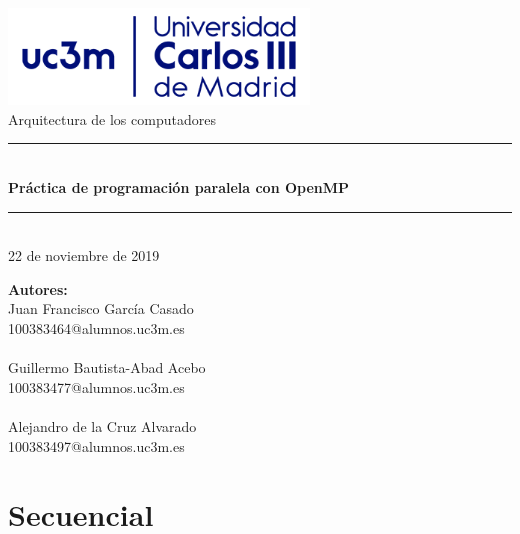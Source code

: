\documentclass[12pt]{article}
\begin{document}
    \begin{center}
    \includegraphics[width=80mm]{uc3m.png}
    \\ \vspace{40mm}
    \LARGE Arquitectura de los computadores
    \\
    \noindent\rule{12cm}{0.4pt}
    \\
    \vspace{5mm}
    \textbf{\Huge Práctica de programación paralela con OpenMP}
    \\
    \noindent\rule{12cm}{0.4pt}
    \\
    \large 22 de noviembre de 2019
    \end{center}
    \vspace{20mm}
    \textbf{\large Autores:}
    \normalsize \\
    Juan Francisco García Casado\\100383464@alumnos.uc3m.es
    \\ \\
    Guillermo Bautista-Abad Acebo\\100383477@alumnos.uc3m.es
    \\ \\
    Alejandro de la Cruz Alvarado\\100383497@alumnos.uc3m.es
    \newpage
    \tableofcontents
    \newpage
    \section{Secuencial}
\end{document}
